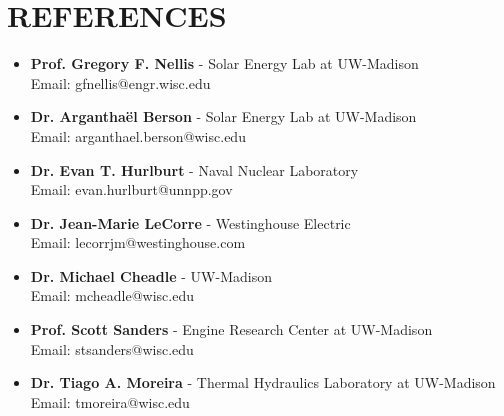 \documentclass[letterpaper,11pt]{article}
\begin{document}
\section{REFERENCES}
\begin{itemize}
\itemsep0em 
  \item[] \small \textbf{Prof. Gregory F. Nellis} - Solar Energy Lab at UW-Madison\\
  Email: gfnellis@engr.wisc.edu
  \item[] \small \textbf{Dr. Arganthaël Berson} - Solar Energy Lab at UW-Madison\\
  Email: arganthael.berson@wisc.edu
  \item[] \small \textbf{Dr. Evan T. Hurlburt} - Naval Nuclear Laboratory\\
  Email: evan.hurlburt@unnpp.gov
  \item[] \small \textbf{Dr. Jean-Marie LeCorre} - Westinghouse Electric\\
  Email: lecorrjm@westinghouse.com
  \item[] \small \textbf{Dr. Michael Cheadle} - UW-Madison\\
  Email: mcheadle@wisc.edu
  \item[] \small \textbf{Prof. Scott Sanders} - Engine Research Center at UW-Madison\\
  Email: stsanders@wisc.edu
  \item[] \small \textbf{Dr. Tiago A. Moreira} - Thermal Hydraulics Laboratory at UW-Madison\\
  Email: tmoreira@wisc.edu
\end{itemize}
\end{document}
